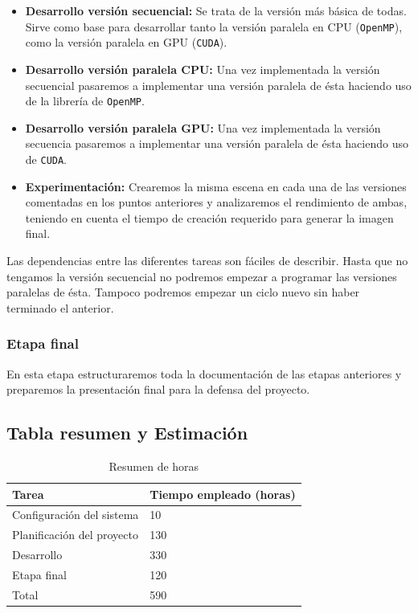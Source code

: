\documentclass[titlepage,12pt]{report}
\begin{document}
\begin{itemize}

	\item \textbf{Desarrollo versión secuencial:} Se trata de la versión más básica de todas. Sirve como base para desarrollar tanto la versión paralela en CPU (\texttt{OpenMP}), como la versión paralela en GPU (\texttt{CUDA}).
	
	\item \textbf{Desarrollo versión paralela CPU:} Una vez implementada la versión secuencial pasaremos a implementar una versión paralela de ésta haciendo uso de la librería de \texttt{OpenMP}. 
	
	\item \textbf{Desarrollo versión paralela GPU:} Una vez implementada la versión secuencia pasaremos a implementar una versión paralela de ésta haciendo uso de \texttt{CUDA}.

	\item \textbf{Experimentación:} Crearemos la misma escena en cada una de las versiones comentadas en los puntos anteriores y analizaremos el rendimiento de ambas, teniendo en cuenta el tiempo de creación requerido para generar la imagen final.

\end{itemize}

Las dependencias entre las diferentes tareas son fáciles de describir. Hasta que no tengamos la versión secuencial no podremos empezar a programar las versiones paralelas de ésta. Tampoco podremos empezar un ciclo nuevo sin haber terminado el anterior.

\subsubsection{Etapa final}

En esta etapa estructuraremos toda la documentación de las etapas anteriores y preparemos la presentación final para la defensa del proyecto.

\subsection{Tabla resumen y Estimación}

\begin{table}[H]
	\centering
	\begin{tabular}{|m{5cm}||m{5cm}|}
		\hline
		Tarea & Tiempo empleado (horas) \\ \hline \hline
		Configuración del sistema & 10 \\ \hline
		Planificación del proyecto & 130 \\ \hline
		Desarrollo & 330 \\ \hline
		Etapa final & 120 \\ \hline \hline
		Total & 590 \\ \hline
	\end{tabular}
	\caption{Resumen de horas}
\end{table}
\end{document}
